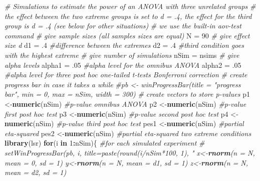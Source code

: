 \documentclass[]{book}
\newenvironment{Shaded}{\begin{snugshade}}{\end{snugshade}}
\newcommand{\CommentTok}[1]{\textcolor[rgb]{0.56,0.35,0.01}{\textit{#1}}}
\newcommand{\ControlFlowTok}[1]{\textcolor[rgb]{0.13,0.29,0.53}{\textbf{#1}}}
\newcommand{\DataTypeTok}[1]{\textcolor[rgb]{0.13,0.29,0.53}{#1}}
\newcommand{\DecValTok}[1]{\textcolor[rgb]{0.00,0.00,0.81}{#1}}
\newcommand{\FloatTok}[1]{\textcolor[rgb]{0.00,0.00,0.81}{#1}}
\newcommand{\KeywordTok}[1]{\textcolor[rgb]{0.13,0.29,0.53}{\textbf{#1}}}
\newcommand{\NormalTok}[1]{#1}
\newcommand{\OperatorTok}[1]{\textcolor[rgb]{0.81,0.36,0.00}{\textbf{#1}}}
\newcommand{\StringTok}[1]{\textcolor[rgb]{0.31,0.60,0.02}{#1}}
\begin{document}
\begin{Shaded}
\begin{Highlighting}[]
\CommentTok{# Simulations to estimate the power of an ANOVA with three unrelated groups}
\CommentTok{# the effect between the two extreme groups is set to d = .4, the effect for the third group is d = .4 (see below for other situations)}
\CommentTok{# we use the built-in aov-test command}
\CommentTok{# give sample sizes (all samples sizes are equal)}
\NormalTok{N =}\StringTok{ }\DecValTok{90}
\CommentTok{# give effect size d}
\NormalTok{d1 =}\StringTok{ }\FloatTok{.4} \CommentTok{#difference between the extremes}
\NormalTok{d2 =}\StringTok{ }\FloatTok{.4} \CommentTok{#third condition goes with the highest extreme}
\CommentTok{# give number of simulations}
\NormalTok{nSim =}\StringTok{ }\NormalTok{nsims}
\CommentTok{# give alpha levels}
\NormalTok{alpha1 =}\StringTok{ }\FloatTok{.05} \CommentTok{#alpha level for the omnibus ANOVA}
\NormalTok{alpha2 =}\StringTok{ }\FloatTok{.05} \CommentTok{#alpha level for three post hoc one-tailed t-tests Bonferroni correction}
\CommentTok{# create progress bar in case it takes a while}
\CommentTok{#pb <- winProgressBar(title = "progress bar", min = 0, max = nSim, width = 300)}
\CommentTok{# create vectors to store p-values}
\NormalTok{p1 <-}\KeywordTok{numeric}\NormalTok{(nSim) }\CommentTok{#p-value omnibus ANOVA}
\NormalTok{p2 <-}\KeywordTok{numeric}\NormalTok{(nSim) }\CommentTok{#p-value first post hoc test}
\NormalTok{p3 <-}\KeywordTok{numeric}\NormalTok{(nSim) }\CommentTok{#p-value second post hoc test}
\NormalTok{p4 <-}\KeywordTok{numeric}\NormalTok{(nSim) }\CommentTok{#p-value third post hoc test}
\NormalTok{pes1 <-}\KeywordTok{numeric}\NormalTok{(nSim) }\CommentTok{#partial eta-squared}
\NormalTok{pes2 <-}\KeywordTok{numeric}\NormalTok{(nSim) }\CommentTok{#partial eta-squared two extreme conditions}
\KeywordTok{library}\NormalTok{(lsr)}
\ControlFlowTok{for}\NormalTok{(i }\ControlFlowTok{in} \DecValTok{1}\OperatorTok{:}\NormalTok{nSim)\{ }\CommentTok{#for each simulated experiment}
 \CommentTok{# setWinProgressBar(pb, i, title=paste(round(i/nSim*100, 1), "%
\NormalTok{  x<-}\KeywordTok{rnorm}\NormalTok{(}\DataTypeTok{n =}\NormalTok{ N, }\DataTypeTok{mean =} \DecValTok{0}\NormalTok{, }\DataTypeTok{sd =} \DecValTok{1}\NormalTok{)}
\NormalTok{  y<-}\KeywordTok{rnorm}\NormalTok{(}\DataTypeTok{n =}\NormalTok{ N, }\DataTypeTok{mean =}\NormalTok{ d1, }\DataTypeTok{sd =} \DecValTok{1}\NormalTok{) }
\NormalTok{  z<-}\KeywordTok{rnorm}\NormalTok{(}\DataTypeTok{n =}\NormalTok{ N, }\DataTypeTok{mean =}\NormalTok{ d2, }\DataTypeTok{sd =} \DecValTok{1}\NormalTok{) }
}
\end{Highlighting}
\end{Shaded}
\end{document}
